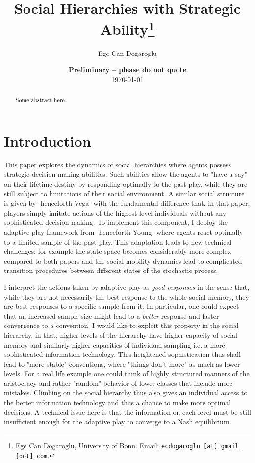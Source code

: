 \documentclass[11pt, a4paper, leqno]{article}
\begin{document}
\title{Social Hierarchies with Strategic Ability\thanks{Ege Can Dogaroglu, University of Bonn. Email: \href{mailto:ecdogaroglu@gmail.com}{\nolinkurl{ecdogaroglu [at] gmail [dot] com}}.}}

\author{Ege Can Dogaroglu}

\date{
    {\bf Preliminary -- please do not quote}
    \\[1ex]
    \today
}

\maketitle


\begin{abstract}
    Some abstract here.
\end{abstract}

\clearpage


\section*{Introduction}
This paper explores the dynamics of social hierarchies where agents possess strategic decision making abilities. Such abilities allow the agents to "have a say" on their lifetime destiny by responding optimally to the past play, while they are still subject to limitations of their social environment. A similar social structure is given by \citet{vega2000unfolding} -henceforth Vega- with the fundamental difference that, in that paper, players simply imitate actions of the highest-level individuals without any sophisticated decision making. To implement this component, I deploy the adaptive play framework from \citet{young1993evolution} -henceforth Young- where agents react optimally to a limited sample of the past play. This adaptation leads to new technical challenges; for example the state space becomes considerably more complex compared to both papers and the social mobility dynamics lead to complicated transition procedures between different states of the stochastic process.

I interpret the actions taken by adaptive play as \textit{good responses} in the sense that, while they are not necessarily the best response to the whole social memory, they are best responses to a specific sample from it. In particular, one could expect that an increased sample size might lead to a \textit{better} response and faster convergence to a convention. I would like to exploit this property in the social hierarchy, in that, higher levels of the hierarchy have higher capacity of social memory and similarly higher capacities of individual sampling i.e. a more sophisticated information technology. This heightened sophistication thus shall lead to "more stable" conventions, where "things don't move" as much as lower levels. For a real life example one could think of highly structured manners of the aristocracy and rather "random" behavior of lower classes that include more mistakes. Climbing on the social hierarchy thus also gives an individual access to the better information technology and thus a chance to make more optimal decisions. A technical issue here is that the information on each level must be still insufficient enough for the adaptive play to converge to a Nash equilibrium.
\end{document}
